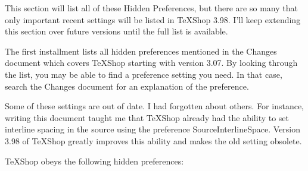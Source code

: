 \documentclass[11pt, oneside]{article}   	%
\begin{document}
This section will list all of these Hidden Preferences, but there are so many that only important recent settings will be listed in TeXShop 3.98. I'll keep extending this section over future versions until the full list is available. 

The first installment lists all hidden preferences mentioned in the Changes document which covers TeXShop starting with version 3.07. By looking through the list, you may be able to find a preference setting you need. In that case, search the Changes document for an explanation of the preference. 

Some of these settings are out of date. I had forgotten about others. For instance, writing this document taught me that TeXShop already had the ability to set interline spacing in the source using the preference SourceInterlineSpace. Version 3.98 of TeXShop greatly improves this ability and makes the old setting obsolete.

\newpage

TeXShop obeys the following hidden preferences:
\end{document}
